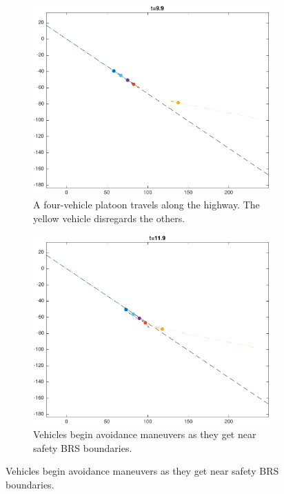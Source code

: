 \begin{figure}
    \centering
    \begin{subfigure}[t]{0.45\columnwidth} \label{subfig:in_100}
        \includegraphics[width=\columnwidth]{fig/in_100}
        \caption{A four-vehicle platoon travels along the highway. The yellow vehicle disregards the others.}
    \end{subfigure}
    \begin{subfigure}[t]{0.45\columnwidth} \label{subfig:in_120}
        \includegraphics[width=\columnwidth]{fig/in_120}
        \caption{Vehicles begin avoidance maneuvers as they get near safety BRS boundaries.}
    \end{subfigure}


\end{figure}

